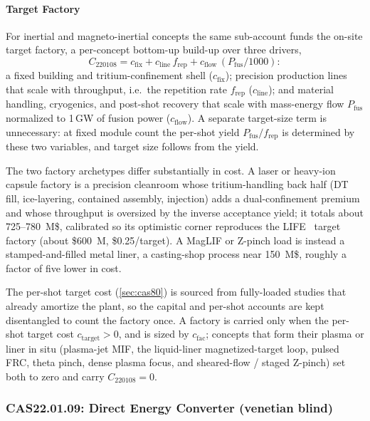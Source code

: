 \documentclass{article}
\begin{document}
\paragraph{Target Factory}
For inertial and magneto-inertial concepts the same sub-account funds the
on-site target factory, a per-concept bottom-up build-up over three drivers,
\begin{equation}
\label{eq:target-factory}
C_{220108} = c_{\text{fix}} + c_{\text{line}}\,f_{\text{rep}} + c_{\text{flow}}\,(P_{\text{fus}}/1000):
\end{equation}
a fixed building and tritium-confinement shell ($c_{\text{fix}}$); precision
production lines that scale with throughput, i.e.\ the repetition rate
$f_{\text{rep}}$ ($c_{\text{line}}$); and material handling, cryogenics, and
post-shot recovery that scale with mass-energy flow $P_{\text{fus}}$
normalized to 1\,GW of fusion power ($c_{\text{flow}}$). A separate target-size term is unnecessary: at fixed
module count the per-shot yield $P_{\text{fus}}/f_{\text{rep}}$ is determined
by these two variables, and target size follows from the yield.

The two factory archetypes differ substantially in cost. A laser or heavy-ion
capsule factory is a precision cleanroom whose tritium-handling back half
(DT fill, ice-layering, contained assembly, injection) adds a
dual-confinement premium and whose throughput is oversized by the inverse
acceptance yield; it totals about 725--780~M\$, calibrated so its optimistic
corner reproduces the LIFE~\cite{anklam2011life} target factory (about
\$600~M, \$0.25/target). A MagLIF or Z-pinch load is instead a
stamped-and-filled metal liner, a casting-shop process near 150~M\$, roughly
a factor of five lower in cost.

The per-shot target cost (\cref{sec:cas80}) is sourced from fully-loaded
studies that already amortize the plant, so the capital and per-shot accounts
are kept disentangled to count the factory once. A factory is carried only
when the per-shot target cost $c_{\text{target}}>0$, and is sized by
$c_{\text{fac}}$; concepts that form their plasma or liner in situ
(plasma-jet MIF, the liquid-liner magnetized-target loop, pulsed FRC, theta
pinch, dense plasma focus, and sheared-flow / staged Z-pinch) set both to
zero and carry $C_{220108} = 0$.

\subsubsection{CAS22.01.09: Direct Energy Converter (venetian blind)}
\label{sec:cas2209}
\end{document}
